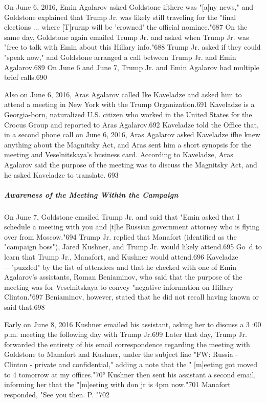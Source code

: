 On June 6, 2016, Emin Agalarov asked Goldstone ifthere was "[a]ny news," and Goldstone explained that Trump Jr. was likely still traveling for the "final elections ... where [T]rurnp will be 'crowned' the official nominee."687 On the same day, Goldstone again emailed Trump Jr. and asked when Trump Jr. was "free to talk with Emin about this Hillary info."688 Trump Jr. asked if they could "speak now," and Goldstone arranged a call between Trump Jr. and Emin Agalarov.689 On June 6 and June 7, Trump Jr. and Emin Agalarov had multiple brief calls.690

Also on June 6, 2016, Aras Agalarov called Ike Kaveladze and asked him to attend a meeting in New York with the Trump Organization.691 Kaveladze is a  Georgia-born, naturalized U.S. citizen who worked in the United States for the Crocus Group and reported to Aras Agalarov.692 Kaveladze told the Office that, in a second phone call on June 6, 2016, Aras Agalarov asked Kaveladze ifhe knew anything about the Magnitsky Act, and Aras sent him a short synopsis for the meeting and Veselnitskaya's business card. According to Kaveladze, Aras Agalarov said the purpose of the meeting was to discuss the Magnitsky Act,  and he asked Kaveladze to translate. 693

\subparagraph{Awareness of the Meeting Within the Campaign}

On June 7, Goldstone emailed Trump Jr. and said that "Emin asked that I  schedule a meeting with you and [t]he Russian government attorney who is flying over from Moscow."694 Trump Jr. replied that Manafort (identified as the "campaign boss"), Jared Kushner, and Trump Jr. would likely attend.695 Go~d to learn that Trump Jr., Manafort, and Kushner would attend.696 Kaveladze ---"puzzled" by the list of attendees and that he checked with one of Emin Agalarov's assistants, Roman Beniaminov,  who said that the purpose of the meeting was for Veselnitskaya to convey "negative information on Hillary Clinton."697 Beniaminov, however, stated that he did not recall having known or said that.698

Early on June 8, 2016 Kushner emailed his assistant, asking her to discuss a  3 :00 p.m. meeting the following day with Trump Jr.699 Later that day, Trump Jr. forwarded the entirety of his email correspondence regarding the meeting with Goldstone to Manafort and Kushner, under the subject line "FW: Russia - Clinton -  private and confidential," adding a note that the " [m]eeting got moved to 4  tomorrow at my offices."70° Kushner then sent his assistant a  second email, informing her that the "[m]eeting with don jr is 4pm now."701 Manafort responded,  "See you then. P. "702

